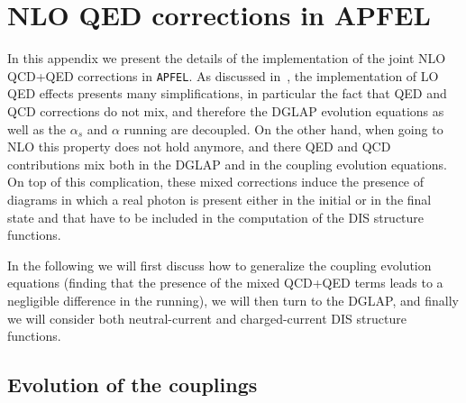 \appendix

\section{NLO QED corrections in APFEL} \label{sec:appendixAPFEL}

In this appendix we present the details of the implementation of the
joint NLO QCD+QED corrections in {\tt APFEL}.
%
As discussed in~\cite{Bertone:2013vaa},
the implementation of LO
QED effects presents many simplifications,
in particular the fact that QED and QCD
corrections do not mix, and therefore the DGLAP evolution
equations as well as the
$\alpha_s$ and $\alpha$ running are decoupled.
%
On the other hand,
when going
to NLO this property does not
hold anymore,
and there QED and QCD contributions mix both in the DGLAP and in the
coupling evolution equations.
%
On top of this complication, these mixed corrections induce
the presence of diagrams in which a real photon is present either in
the initial or in the final state and that have to be included in the
computation of the DIS structure functions.

In the following we will
first discuss how to generalize the coupling evolution equations
(finding that the presence of the mixed QCD+QED terms leads to a
negligible difference in the running), we will then turn to the DGLAP,
and finally we will consider both neutral-current and charged-current
DIS structure functions.

\subsection{Evolution of the couplings}

